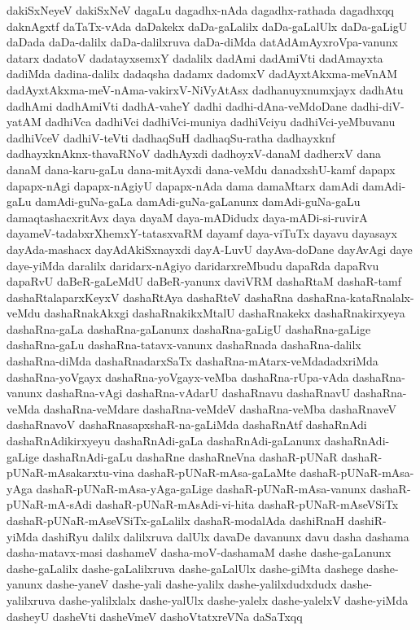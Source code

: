 {dakiSxNeyeV
dakiSxNeV
dagaLu
dagadhx-nAda
dagadhx-rathada
dagadhxqq
daknAgxtf
daTaTx-vAda
daDakekx
daDa-gaLalilx
daDa-gaLalUlx
daDa-gaLigU
daDada
daDa-dalilx
daDa-dalilxruva
daDa-diMda
datAdAmAyxroVpa-vanunx
datarx
dadatoV
dadatayxsemxY
dadalilx
dadAmi
dadAmiVti
dadAmayxta
dadiMda
dadina-dalilx
dadaqsha
dadamx
dadomxV
dadAyxtAkxma-meVnAM
dadAyxtAkxma-meV-nAma-vakirxV-NiVyAtAsx
dadhanuyxnumxjayx
dadhAtu
dadhAmi
dadhAmiVti
dadhA-vaheY
dadhi
dadhi-dAna-veMdoDane
dadhi-diV-yatAM
dadhiVca
dadhiVci
dadhiVci-muniya
dadhiVciyu
dadhiVci-yeMbuvanu
dadhiVceV
dadhiV-teVti
dadhaqSuH
dadhaqSu-ratha
dadhayxknf
dadhayxknAknx-thavaRNoV
dadhAyxdi
dadhoyxV-danaM
dadherxV
dana
danaM
dana-karu-gaLu
dana-mitAyxdi
dana-veMdu
danadxshU-kamf
dapapx
dapapx-nAgi
dapapx-nAgiyU
dapapx-nAda
dama
damaMtarx
damAdi
damAdi-gaLu
damAdi-guNa-gaLa
damAdi-guNa-gaLanunx
damAdi-guNa-gaLu
damaqtashacxritAvx
daya
dayaM
daya-mADidudx
daya-mADi-si-ruvirA
dayameV-tadabxrXhemxY-tatasxvaRM
dayamf
daya-viTuTx
dayavu
dayasayx
dayAda-mashacx
dayAdAkiSxnayxdi
dayA-LuvU
dayAva-doDane
dayAvAgi
daye
daye-yiMda
daralilx
daridarx-nAgiyo
daridarxreMbudu
dapaRda
dapaRvu
dapaRvU
daBeR-gaLeMdU
daBeR-yanunx
daviVRM
dashaRtaM
dashaR-tamf
dashaRtalaparxKeyxV
dashaRtAya
dashaRteV
dashaRna
dashaRna-kataRnalalx-veMdu
dashaRnakAkxgi
dashaRnakikxMtalU
dashaRnakekx
dashaRnakirxyeya
dashaRna-gaLa
dashaRna-gaLanunx
dashaRna-gaLigU
dashaRna-gaLige
dashaRna-gaLu
dashaRna-tatavx-vanunx
dashaRnada
dashaRna-dalilx
dashaRna-diMda
dashaRnadarxSaTx
dashaRna-mAtarx-veMdadadxriMda
dashaRna-yoVgayx
dashaRna-yoVgayx-veMba
dashaRna-rUpa-vAda
dashaRna-vanunx
dashaRna-vAgi
dashaRna-vAdarU
dashaRnavu
dashaRnavU
dashaRna-veMda
dashaRna-veMdare
dashaRna-veMdeV
dashaRna-veMba
dashaRnaveV
dashaRnavoV
dashaRnasapxshaR-na-gaLiMda
dashaRnAtf
dashaRnAdi
dashaRnAdikirxyeyu
dashaRnAdi-gaLa
dashaRnAdi-gaLanunx
dashaRnAdi-gaLige
dashaRnAdi-gaLu
dashaRne
dashaRneVna
dashaR-pUNaR
dashaR-pUNaR-mAsakarxtu-vina
dashaR-pUNaR-mAsa-gaLaMte
dashaR-pUNaR-mAsa-yAga
dashaR-pUNaR-mAsa-yAga-gaLige
dashaR-pUNaR-mAsa-vanunx
dashaR-pUNaR-mA-sAdi
dashaR-pUNaR-mAsAdi-vi-hita
dashaR-pUNaR-mAseVSiTx
dashaR-pUNaR-mAseVSiTx-gaLalilx
dashaR-modalAda
dashiRnaH
dashiR-yiMda
dashiRyu
dalilx
dalilxruva
dalUlx
davaDe
davanunx
davu
dasha
dashama
dasha-matavx-masi
dashameV
dasha-moV-dashamaM
dashe
dashe-gaLanunx
dashe-gaLalilx
dashe-gaLalilxruva
dashe-gaLalUlx
dashe-giMta
dashege
dashe-yanunx
dashe-yaneV
dashe-yali
dashe-yalilx
dashe-yalilxdudxdudx
dashe-yalilxruva
dashe-yalilxlalx
dashe-yalUlx
dashe-yalelx
dashe-yalelxV
dashe-yiMda
dasheyU
dasheVti
dasheVmeV
dashoVtatxreVNa
daSaTxqq
}
